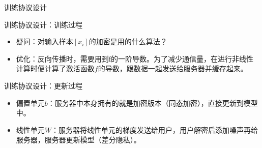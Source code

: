 \documentclass{beamer}
\begin{document}
\begin{frame}{训练协议设计}
    \begin{minipage}[l]{0.7\linewidth}
    \begin{exampleblock}{训练协议设计：训练过程}
        	\begin{itemize}
    		\item {\footnotesize {\color {blue}疑问：对输入样本$[x_i]$的加密是用的什么算法？}}
    		\item {\footnotesize 优化：反向传播时，需要用到f的一阶导数。为了减少通信量，在进行非线性计算时便计算了激活函数$f$的导数，跟数据一起发送给服务器并缓存起来。}
    	\end{itemize}
    \end{exampleblock}
    \begin{exampleblock}{训练协议设计：更新过程}
        	\begin{itemize}
    		\item {\footnotesize 偏置单元$b$：服务器中本身拥有的就是加密版本（同态加密），直接更新到模型中。}
    		\item {\footnotesize 线性单元$W$：服务器将线性单元的梯度发送给用户，用户解密后添加噪声再给服务器，服务器更新模型（差分隐私）。}
    	\end{itemize}
    \end{exampleblock}
   \end{minipage}
    \begin{minipage}{0.2\linewidth}
        \begin{figure}[h]
            \centering
             \hspace{2cm}

\end{figure}
\end{minipage}
\end{frame}
\end{document}
